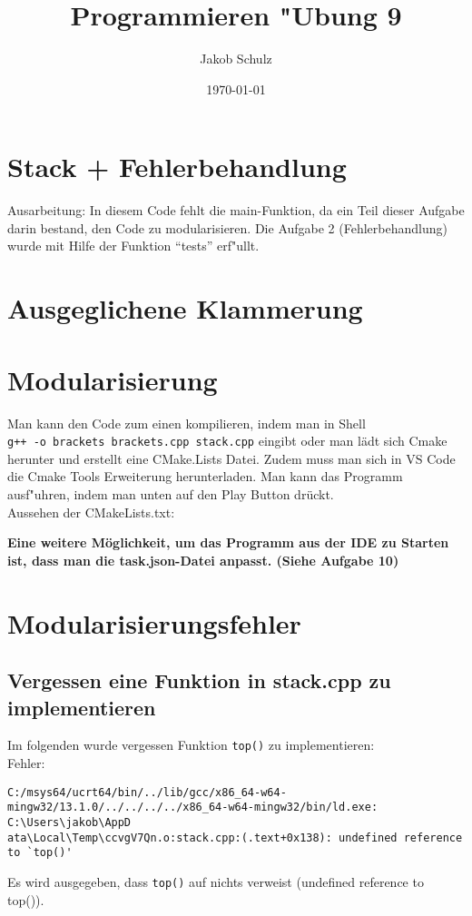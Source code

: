 \documentclass[a4paper,11pt,titlepage]{article}
\begin{document}
\title{Programmieren "Ubung 9}


\author{Jakob Schulz}


\date{\today}

\maketitle{\thispagestyle{plain}}

\section{Stack + Fehlerbehandlung}
Ausarbeitung:
In diesem Code fehlt die main-Funktion, da ein Teil dieser Aufgabe darin bestand, den Code zu modularisieren.
Die Aufgabe 2 (Fehlerbehandlung) wurde mit Hilfe der Funktion "`tests"' erf"ullt.
\newpage
{}
\section{Ausgeglichene Klammerung}
\newpage
\section{Modularisierung}

Man kann den Code zum einen kompilieren, indem man in Shell\\\verb?g++ -o brackets brackets.cpp stack.cpp? eingibt oder man lädt sich Cmake herunter und erstellt eine CMake.Lists Datei. Zudem muss man sich in VS Code die Cmake Tools Erweiterung herunterladen. Man kann das Programm ausf"uhren, indem man unten auf den Play Button drückt.\\
Aussehen der CMakeLists.txt:

\textbf{Eine weitere Möglichkeit, um das Programm aus der IDE zu Starten ist, dass man die task.json-Datei anpasst. (Siehe Aufgabe 10)}
\section{Modularisierungsfehler}
\subsection{Vergessen eine Funktion in stack.cpp zu implementieren}
Im folgenden wurde vergessen Funktion \verb+top()+ zu implementieren:\\
Fehler:
\begin{verbatim}
C:/msys64/ucrt64/bin/../lib/gcc/x86_64-w64-mingw32/13.1.0/../../../../x86_64-w64-mingw32/bin/ld.exe: C:\Users\jakob\AppD
ata\Local\Temp\ccvgV7Qn.o:stack.cpp:(.text+0x138): undefined reference to `top()'
\end{verbatim}
Es wird ausgegeben, dass \verb+top()+ auf nichts verweist (undefined reference to top()).
\end{document}
